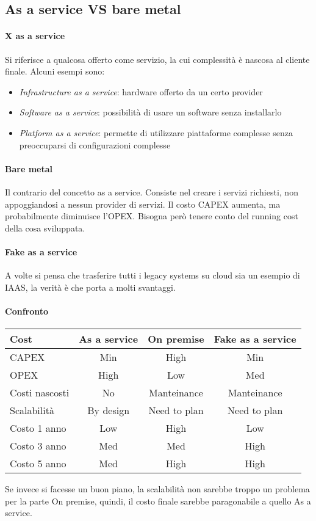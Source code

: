 \subsection{As a service VS bare metal}

\paragraph{X as a service}
Si riferisce a qualcosa offerto come servizio, la cui complessità è nascosa al 
cliente finale.
Alcuni esempi sono:
\begin{itemize}
    \item \emph{Infrastructure as a service}: hardware offerto da un certo provider
    \item \emph{Software as a service}: possibilità di usare un software senza installarlo
    \item \emph{Platform as a service}: permette di utilizzare piattaforme complesse
    senza preoccuparsi di configurazioni complesse
\end{itemize}

\paragraph{Bare metal}
Il contrario del concetto as a service. Consiste nel creare i servizi richiesti, 
non appoggiandosi a nessun provider di servizi. 
Il costo CAPEX aumenta, ma probabilmente diminuisce l'OPEX. Bisogna però tenere conto
del running cost della cosa sviluppata.

\paragraph{Fake as a service}
A volte si pensa che trasferire tutti i legacy systems su cloud sia un esempio di 
IAAS, la verità è che porta a molti svantaggi.

\paragraph{Confronto}
\begin{center}
    \begin{tabular}{lccc} 
    \toprule
        Cost & As a service & On premise & Fake as a service \\
    \midrule
        CAPEX & Min& High& Min\\ 
        OPEX & High &  Low & Med\\
        Costi nascosti  & No & Manteinance & Manteinance\\
        Scalabilità &  By design & Need to plan & Need to plan\\
        Costo 1 anno &  Low & High & Low\\
        Costo 3 anno &  Med & Med & High\\
        Costo 5 anno &  Med & High & High\\
    \bottomrule
   \end{tabular}
\end{center}
Se invece si facesse un buon piano, la scalabilità non sarebbe troppo un problema per
la parte On premise, quindi, il costo finale sarebbe paragonabile a quello As a service.

